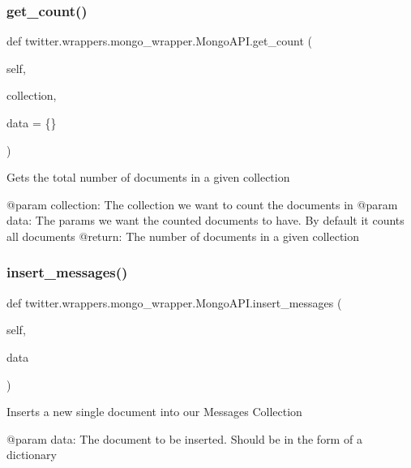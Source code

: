\subsubsection{\texorpdfstring{get\+\_\+count()}{get\_count()}}
{\footnotesize\ttfamily def twitter.\+wrappers.\+mongo\+\_\+wrapper.\+Mongo\+A\+P\+I.\+get\+\_\+count (\begin{DoxyParamCaption}\item[{}]{self,  }\item[{}]{collection,  }\item[{}]{data = {\ttfamily \{\}} }\end{DoxyParamCaption})}

\begin{DoxyVerb}Gets the total number of documents in a given collection

@param collection: The collection we want to count the documents in
@param data: The params we want the counted documents to have. By default it counts all documents
@return: The number of documents in a given collection
\end{DoxyVerb}
 \mbox{\label{classtwitter_1_1wrappers_1_1mongo__wrapper_1_1MongoAPI_af601222e36a6c0b6e131f788388ef992}} 
\subsubsection{\texorpdfstring{insert\+\_\+messages()}{insert\_messages()}}
{\footnotesize\ttfamily def twitter.\+wrappers.\+mongo\+\_\+wrapper.\+Mongo\+A\+P\+I.\+insert\+\_\+messages (\begin{DoxyParamCaption}\item[{}]{self,  }\item[{}]{data }\end{DoxyParamCaption})}

\begin{DoxyVerb}Inserts a new single document into our Messages Collection

@param data: The document to be inserted. Should be in the form of a dictionary
\end{DoxyVerb}
 \mbox{\label{classtwitter_1_1wrappers_1_1mongo__wrapper_1_1MongoAPI_a83f45c0a62f892db52f103756a523716}} 
